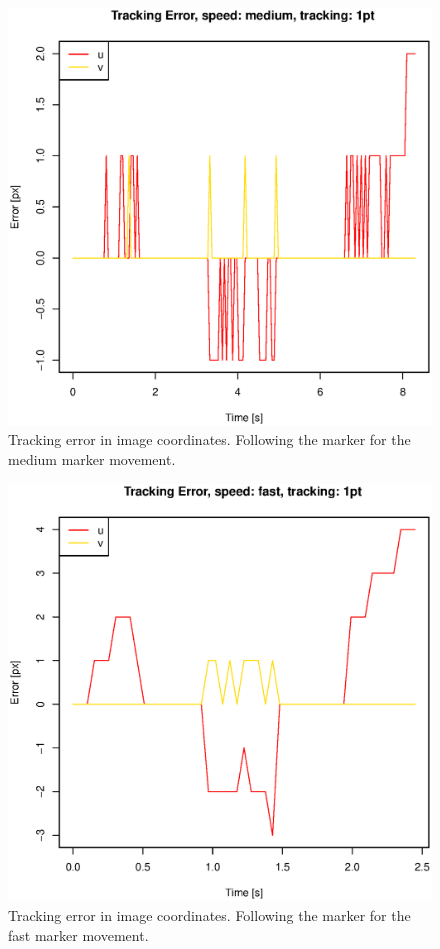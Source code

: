 \begin{figure}[H]
\centering
\includegraphics[width= \linewidth]{graphics/robotics/trackingError_medium_1pt}
\caption{Tracking error in image coordinates.
Following the marker for the medium marker movement.}
\label{fig:trackingerror_medium_1p}
\end{figure}


\begin{figure}[H]
\centering
\includegraphics[width= \linewidth]{graphics/robotics/trackingError_fast_1pt}
\caption{Tracking error in image coordinates.
Following the marker for the fast marker movement.}
\label{fig:trackingerror_fast_1p}
\end{figure}



